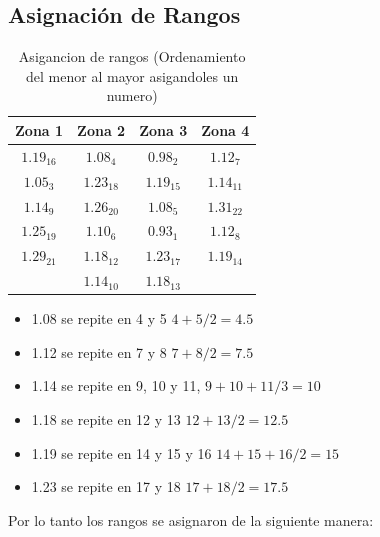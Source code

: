 \documentclass{article}
\begin{document}
\subsection*{Asignación de Rangos}

\begin{table}[ht]
    \centering
    \caption{Asigancion de rangos (Ordenamiento del menor al mayor asigandoles un numero)}
    \begin{tabular}{cccc}
        \toprule
        Zona 1      & Zona 2      & Zona 3      & Zona 4      \\
        \midrule
        $1.19_{16}$ & $1.08_{4}$  & $0.98_{2}$  & $1.12_{7}$  \\
        $1.05_{3}$  & $1.23_{18}$ & $1.19_{15}$ & $1.14_{11}$ \\
        $1.14_{9}$  & $1.26_{20}$ & $1.08_{5}$  & $1.31_{22}$ \\
        $1.25_{19}$ & $1.10_{6}$  & $0.93_{1}$  & $1.12_{8}$  \\
        $1.29_{21}$ & $1.18_{12}$ & $1.23_{17}$ & $1.19_{14}$ \\
                    & $1.14_{10}$ & $1.18_{13}$ &             \\
        \bottomrule
    \end{tabular}
\end{table}

\begin{itemize}
    \item 1.08 se repite en 4 y 5 $4+5/2 = 4.5$
    \item 1.12 se repite en 7 y 8 $7+8/2 = 7.5$
    \item 1.14 se repite en 9, 10 y 11, $9+10+11/3=10$
    \item 1.18 se repite en 12 y 13 $12 + 13 / 2 = 12.5$
    \item 1.19 se repite en 14 y 15 y 16 $14 + 15 + 16 / 2 = 15$
    \item 1.23 se repite en 17 y 18 $17 + 18 / 2 = 17.5$
\end{itemize}

Por lo tanto los rangos se asignaron de la siguiente manera:
\end{document}
